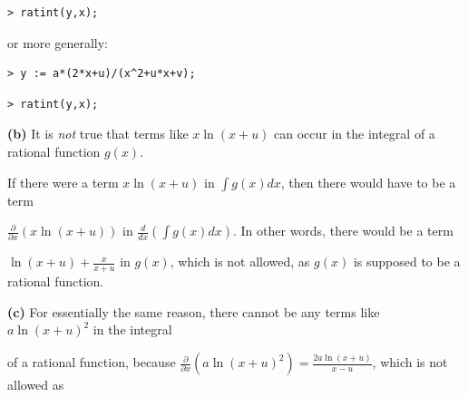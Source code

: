 \documentclass{article}
\begin{document}
\begin{lstlisting}
> ratint(y,x);
\end{lstlisting}
\begin{Maple Normal}
or more generally:
\end{Maple Normal}
\begin{lstlisting}
> y := a*(2*x+u)/(x^2+u*x+v);
\end{lstlisting}
\begin{lstlisting}
> ratint(y,x);
\end{lstlisting}
\begin{Maple Normal}

\end{Maple Normal}
\begin{Maple Normal}

\end{Maple Normal}
\begin{Maple Normal}
\textbf{(b)} It is \textit{not} true that terms like 
$x \ln (x +u)$ can occur in the integral of a rational function 
$g (x)$.  
\end{Maple Normal}
\begin{Maple Normal}
If there were a term 
$x \ln (x +u)$ in 
$\int g (x)d x$, then there would have to be a term 
\end{Maple Normal}
\begin{Maple Normal}

$\frac{\partial}{\partial x} (x \ln (x +u))$ in 
$\frac{d}{d x} (\int g (x)d x)$.  In other words, there would be a term 
\end{Maple Normal}
\begin{Maple Normal}

$\ln (x +u)+\frac{x}{x +u}$ in 
$g (x)$, which is not allowed, as 
$g (x)$ is supposed to be a rational function.
\end{Maple Normal}
\begin{Maple Normal}

\end{Maple Normal}
\begin{Maple Normal}

\end{Maple Normal}
\begin{Maple Normal}
\textbf{(c) }For essentially the same reason, there cannot be any terms like 
$a \ln (x +u)^{2}$ in the integral 
\end{Maple Normal}
\begin{Maple Normal}
of a rational function, because 
$\frac{\partial}{\partial x} (a \ln (x +u)^{2})=\frac{2 a \ln (x +u)}{x -u}$, which is not allowed as
\end{Maple Normal}
\end{document}
